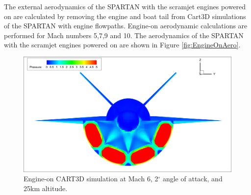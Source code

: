 		
		The external aerodynamics of the SPARTAN with the scramjet engines powered on are calculated by removing the engine and boat tail from Cart3D simulations of the SPARTAN with engine flowpaths. Engine-on aerodynamic calculations are performed for Mach numbers 5,7,9 and 10. The aerodynamics of the SPARTAN with the scramjet engines powered on are shown in Figure \ref{fig:EngineOnAero}.
		
		
		\begin{figure}[ht]
			\centering
			\includegraphics[width=0.9\linewidth]{figures/3_vehicle_design/EngineOn}
			\caption{Engine-on CART3D simulation at Mach 6, 2$^\circ$ angle of attack, and 25km altitude.}
			\label{fig:EngineOn}
		\end{figure}
		
